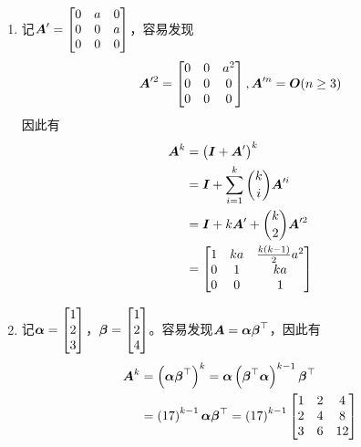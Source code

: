 \documentclass{ctexart}
\begin{document}
\setcounter{problem}{21}
\begin{problem}\

\begin{enumerate}
    \item 记\(\boldsymbol{A}'=\begin{bmatrix}0&a&0\\0&0&a\\0&0&0\end{bmatrix}\)，容易发现
          \begin{equation*}
              \boldsymbol{A}'^2=\begin{bmatrix}0&0&a^2\\0&0&0\\0&0&0\end{bmatrix},\boldsymbol{A}'^n=\boldsymbol{O}(n\ge3)
          \end{equation*}
          因此有
          \begin{align*}
              \boldsymbol{A}^k & =\left( \boldsymbol{I}+\boldsymbol{A}' \right)^k                 \\
                      & =\boldsymbol{I}+\sum_{i=1}^k\binom{k}{i}\boldsymbol{A}'^i \\
                      & =\boldsymbol{I}+k\boldsymbol{A}'+\binom{k}{2}\boldsymbol{A}'^2     \\
                      & =\begin{bmatrix}
                             1 & ka & \frac{k(k-1)}{2}a^2 \\
                             0 & 1  & ka                  \\
                             0 & 0  & 1
                         \end{bmatrix}
          \end{align*}
    \item 记\(\boldsymbol{\alpha}=\begin{bmatrix}1\\2\\3\end{bmatrix}\)，\(\boldsymbol{\beta}=\begin{bmatrix}1\\2\\4\end{bmatrix}\)。容易发现\(\boldsymbol{A}=\boldsymbol{\alpha}\boldsymbol{\beta}^\top\)，因此有
          \begin{align*}
              \boldsymbol{A}^k & =\left( \boldsymbol{\alpha}\boldsymbol{\beta}^\top \right)^k=\boldsymbol{\alpha}\left( \boldsymbol{\beta}^\top\boldsymbol{\alpha} \right)^{k-1}\boldsymbol{\beta}^\top \\
                      & =\left( 17 \right)^{k-1}\boldsymbol{\alpha}\boldsymbol{\beta}^\top=\left( 17 \right)^{k-1}
              \begin{bmatrix}
                  1 & 2 & 4 \\2&4&8\\3&6&12
              \end{bmatrix}
          \end{align*}
\end{enumerate}

\end{problem}
\end{document}
